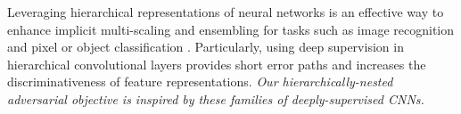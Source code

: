 \documentclass[10pt,twocolumn,letterpaper]{article}
\begin{document}

Leveraging hierarchical representations of neural networks is an effective way to enhance implicit multi-scaling and ensembling for tasks such as image recognition \cite{lee2015deeply} and pixel or object classification \cite{xie2015holistically,cai2016unified,long2015fully}. Particularly, using deep supervision \cite{lee2015deeply} in hierarchical convolutional layers provides short error paths and increases the discriminativeness of feature representations. 
\textit{Our hierarchically-nested adversarial objective is inspired by these families of deeply-supervised CNNs. }

%
%
\end{document}
